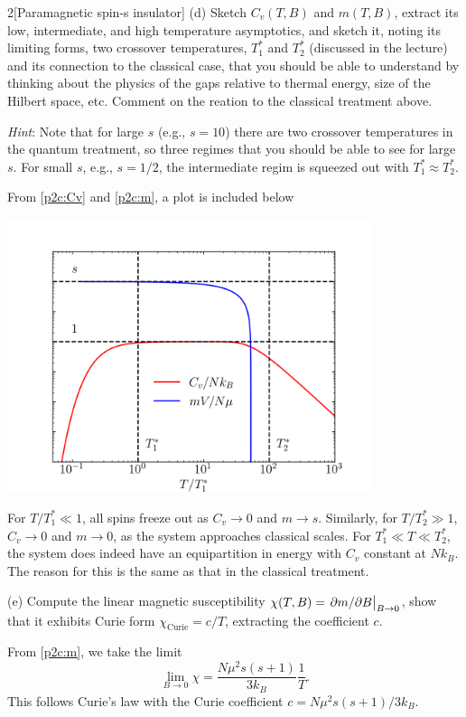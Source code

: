 \documentclass[12pt]{article}
\begin{document}
\begin{problem}{2}[Paramagnetic spin-s insulator]
(d) Sketch $C_v(T,B)$ and $m(T,B)$, extract its low, intermediate, and high
temperature asymptotics, and sketch it, noting its limiting forms, two crossover
temperatures, $T_1^\ast$ and $T_2^\ast$ (discussed in the lecture) and its
connection to the classical case, that you should be able to understand by
thinking about the physics of the gaps relative to thermal energy, size of the
Hilbert space, etc. Comment on the reation to the classical treatment above.

\textit{Hint}: Note that for large $s$ (e.g., $s=10$) there are two crossover
temperatures in the quantum treatment, so three regimes that you should be able
to see for large $s$. For small $s$, e.g., $s=1/2$, the intermediate regim is
squeezed out with $T_1^\ast\approx T_2^\ast$.

\begin{solution}
From \eqref{p2c:Cv} and \eqref{p2c:m}, a plot is included below 
\begin{center}
    \includegraphics[width=0.8\textwidth]{p2d.png} 
\end{center}
For $T/T_1^\ast\ll1$, all spins freeze out as $C_v\to0$ and $m\to s$. Similarly,
for $T/T_2^\ast\gg 1$, $C_v\to0$ and $m\to0$, as the system approaches classical
scales. For $T_1^\ast\ll T\ll T_2^\ast$, the system does indeed have an
equipartition in energy with $C_v$ constant at $Nk_B$. The reason for this is
the same as that in the classical treatment.
\end{solution}

(e) Compute the linear magnetic susceptibility $\chi(T,B)=\eval{\partial
m/\partial B}_{B\to0}$, show that it exhibits Curie form
$\chi_\text{Curie}=c/T$, extracting the coefficient $c$.

\begin{solution}
From \eqref{p2c:m}, we take the limit
\begin{equation}
    \lim_{B\to0}\chi=\frac{N\mu^2s(s+1)}{3k_B}\frac1T.
\end{equation}
This follows Curie's law with the Curie coefficient $c=N\mu^2s(s+1)/3k_B$.
\end{solution}


\end{problem}
\end{document}
